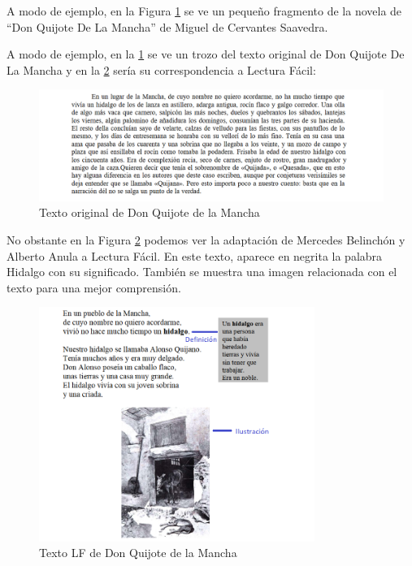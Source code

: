 A modo de ejemplo, en la Figura \ref{fig:Quijote} se ve un pequeño fragmento de la novela de ``Don Quijote De La Mancha'' de Miguel de Cervantes Saavedra. 

 \setlength{\parskip}{10pt}
 
A modo de ejemplo, en la \ref{fig:Quijote} se ve un trozo del texto original de Don Quijote De La Mancha y en la \ref{fig:QuijoteLF} sería su correspondencia a Lectura Fácil:



\begin{figure}[htb]
	\centering
	\includegraphics[width=1.10\textwidth]{Imagenes/Ejemplos/Cap1DonQuijote}
	\caption{Texto original de Don Quijote de la Mancha}
	\label{fig:Quijote}
\end{figure} 
No obstante en la Figura \ref{fig:QuijoteLF} podemos ver la adaptación de Mercedes Belinchón y Alberto Anula a Lectura Fácil. En este texto, aparece en negrita la palabra Hidalgo con su significado. También se muestra una imagen relacionada con el texto para una mejor comprensión.

\begin{figure}[htb]
	\centering
	\includegraphics[width=0.8\textwidth]{Imagenes/Ejemplos/Cap1DonQuijoteLF}
	\caption{Texto LF de Don Quijote de la Mancha}
	\label{fig:QuijoteLF}
\end{figure}




